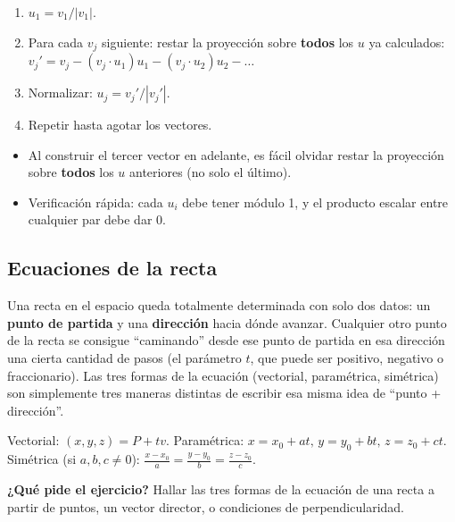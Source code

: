 \documentclass[11pt,a4paper]{article}
\newcommand{\qpide}[1]{\textbf{¿Qué pide el ejercicio?} #1\par}
\begin{document}
\begin{proc}
\begin{enumerate}
    \item $u_1=v_1/|v_1|$.
    \item Para cada $v_j$ siguiente: restar la proyección sobre \textbf{todos} los $u$ ya
    calculados: $v_j'=v_j-(v_j\cdot u_1)u_1-(v_j\cdot u_2)u_2-\dots$
    \item Normalizar: $u_j=v_j'/|v_j'|$.
    \item Repetir hasta agotar los vectores.
\end{enumerate}
\end{proc}

\begin{atencion}
\begin{itemize}
    \item Al construir el tercer vector en adelante, es fácil olvidar restar la
    proyección sobre \textbf{todos} los $u$ anteriores (no solo el último).
    \item Verificación rápida: cada $u_i$ debe tener módulo 1, y el producto escalar entre
    cualquier par debe dar 0.
\end{itemize}
\end{atencion}

\subsection{Ecuaciones de la recta}

\begin{intuicion}
Una recta en el espacio queda totalmente determinada con solo dos datos: un
\textbf{punto de partida} y una \textbf{dirección} hacia dónde avanzar. Cualquier otro
punto de la recta se consigue ``caminando'' desde ese punto de partida en esa dirección
una cierta cantidad de pasos (el parámetro $t$, que puede ser positivo, negativo o
fraccionario). Las tres formas de la ecuación (vectorial, paramétrica, simétrica) son
simplemente tres maneras distintas de escribir esa misma idea de ``punto + dirección''.
\end{intuicion}

\begin{teoria}[Formas]
Vectorial: $(x,y,z)=P+tv$. Paramétrica: $x=x_0+at,\,y=y_0+bt,\,z=z_0+ct$. Simétrica (si
$a,b,c\neq0$): $\frac{x-x_0}{a}=\frac{y-y_0}{b}=\frac{z-z_0}{c}$.
\end{teoria}

\qpide{Hallar las tres formas de la ecuación de una recta a partir de puntos, un vector
director, o condiciones de perpendicularidad.}
\end{document}
